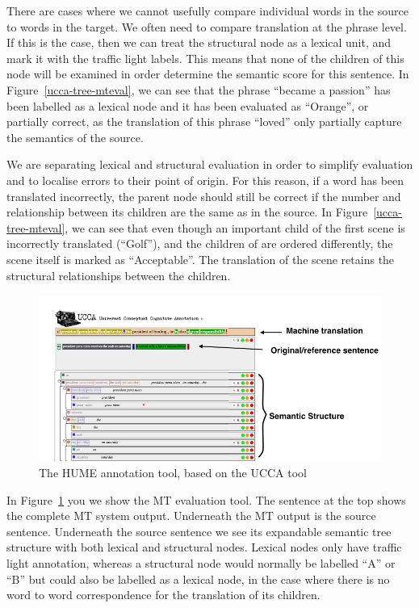 \documentclass[11pt]{article}
\begin{document}

There are cases where we cannot usefully compare individual words in the source to words in the target.
We often need to compare translation at the phrase level. If this is the case, then we can 
 treat the structural node as a lexical unit, and mark it with the traffic light labels. This 
means that none of the children of this node will be examined in order determine the semantic score
for this sentence. 
In Figure~\ref{ucca-tree-mteval}, we can see that the phrase ``became a passion'' has been labelled as a lexical
node and it has been evaluated as ``Orange'', or partially correct, as the translation of this phrase ``loved'' 
only partially capture the semantics of the source.

We are separating lexical and structural evaluation in order to simplify evaluation and to localise errors
to their point of origin. For this reason, if a word has been translated incorrectly,
the parent node should still be correct if the number and relationship between its children are the same
as in the source. 
In Figure~\ref{ucca-tree-mteval}, we can see that even though an important child of the first scene is 
incorrectly translated (``Golf''), and the children of are ordered differently, 
the scene itself is marked as ``Acceptable''. The translation of the scene retains the structural 
relationships between the children.
\\

\begin{figure}[t]
    \begin{center}
    \includegraphics[width=1\textwidth]{interface-annotations}
    \caption{The HUME annotation tool, based on the UCCA tool}
    \label{mttool}
    \end{center}
\end{figure}

In Figure~\ref{mttool} you we show the MT evaluation tool. The sentence at the top shows the complete MT system output. Underneath the MT output is the  source sentence.  Underneath the source sentence we see its expandable semantic tree structure with both lexical and structural nodes. Lexical nodes only have traffic light annotation, whereas a structural node would normally be labelled ``A'' or ``B'' but could also be labelled as a lexical node, in the case where there is no word to word correspondence for the translation of its children.
\end{document}
